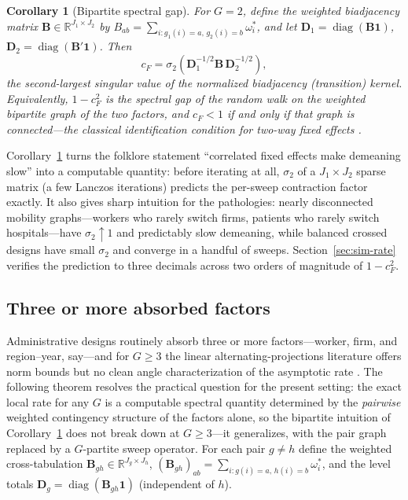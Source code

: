 \documentclass[11pt]{article}
\newtheorem{corollary}{Corollary}
\newcommand{\R}{\mathbb{R}}
\newcommand{\diag}{\operatorname{diag}}
\newcommand{\bB}{\mathbf{B}}
\newcommand{\bD}{\mathbf{D}}
\begin{document}
\begin{corollary}[Bipartite spectral gap]\label{cor:bipartite}
For $G = 2$, define the weighted biadjacency matrix
$\bB \in \R^{J_1 \times J_2}$ by
$B_{ab} = \sum_{i : g_1(i) = a,\, g_2(i) = b} \omega_i^\ast$, and let
$\bD_1 = \diag(\bB \mathbf{1})$, $\bD_2 = \diag(\bB' \mathbf{1})$.  Then
\[
c_F = \sigma_2\!\left( \bD_1^{-1/2} \bB\, \bD_2^{-1/2} \right),
\]
the second-largest singular value of the normalized biadjacency
(transition) kernel.  Equivalently, $1 - c_F^2$ is the spectral gap of
the random walk on the weighted bipartite graph of the two factors, and
$c_F < 1$ if and only if that graph is connected---the classical
identification condition for two-way fixed effects
\citep{abowd1999,gaure2013}.
\end{corollary}

Corollary~\ref{cor:bipartite} turns the folklore statement
``correlated fixed effects make demeaning slow'' into a computable
quantity: before iterating at all, $\sigma_2$ of a $J_1 \times J_2$
sparse matrix (a few Lanczos iterations) predicts the per-sweep
contraction factor exactly.  It also gives sharp intuition for the
pathologies: nearly disconnected mobility graphs---workers who rarely
switch firms, patients who rarely switch hospitals---have
$\sigma_2 \uparrow 1$ and predictably slow demeaning, while balanced
crossed designs have small $\sigma_2$ and converge in a handful of
sweeps.  Section~\ref{sec:sim-rate} verifies the prediction to three
decimals across two orders of magnitude of $1 - c_F^2$.

\subsection{Three or more absorbed factors}\label{sec:multiG}

Administrative designs routinely absorb three or more factors---worker,
firm, and region--year, say---and for $G \ge 3$ the linear
alternating-projections literature offers norm bounds but no clean angle
characterization of the asymptotic rate \citep{deutsch2001,badea2012}.
The following theorem resolves the practical question for the present
setting:
the exact local rate for any $G$ is a computable spectral quantity
determined by the \emph{pairwise} weighted contingency structure of the
factors alone, so the bipartite intuition of
Corollary~\ref{cor:bipartite} does not break down at $G \ge 3$---it
generalizes, with the pair graph replaced by a $G$-partite sweep
operator.  For each pair $g \ne h$ define the weighted cross-tabulation
$\bB_{gh} \in \R^{J_g \times J_h}$,
$(\bB_{gh})_{ab} = \sum_{i : g(i)=a,\, h(i)=b} \omega_i^\ast$, and the
level totals $\bD_g = \diag(\bB_{gh}\mathbf{1})$ (independent of $h$).
\end{document}
